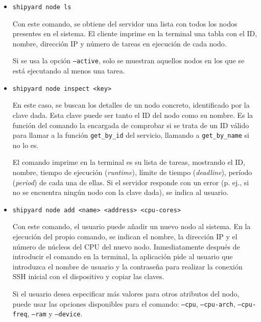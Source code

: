 \begin{itemize}
    \item \lstinline{shipyard node ls}

          Con este comando, se obtiene del servidor una lista con todos los nodos
          presentes en el sistema. El cliente imprime en la terminal una tabla con
          el ID, nombre, dirección IP y número de tareas en ejecución de cada
          nodo.

          Si se usa la opción \texttt{--active}, solo se muestran aquellos nodos
          en los que se está ejecutando al menos una tarea.

    \item \lstinline{shipyard node inspect <key>}

          En este caso, se buscan los detalles de un nodo concreto, identificado
          por la clave dada. Esta clave puede ser tanto el ID del nodo como su
          nombre. Es la función del comando la encargada de comprobar si se trata
          de un ID válido  para llamar a la función \lstinline{get_by_id} del
          servicio, llamando a \lstinline{get_by_name} si no lo es.

          El comando imprime en la terminal es su lista de tareas, mostrando el
          ID, nombre, tiempo de ejecución (\textit{runtime}), límite de tiempo
          (\textit{deadline}), período (\textit{period}) de cada una de ellas. Si
          el servidor responde con un error (p. ej., si no se encuentra ningún
          nodo con la clave dada), se indica al usuario.

    \item \lstinline{shipyard node add <name> <address> <cpu-cores>}

          Con este comando, el usuario puede añadir un nuevo nodo al sistema. En
          la ejecución del propio comando, se indican el nombre, la dirección IP y
          el número de núcleos del CPU del nuevo nodo. Inmediatamente después de
          introducir el comando en la terminal, la aplicación pide al usuario que
          introduzca el nombre de usuario y la contraseña para realizar la
          conexión SSH inicial con el dispositivo y copiar las claves.

          Si el usuario desea especificar más valores para otros atributos del
          nodo, puede usar las opciones disponibles para el comando:
          \texttt{--cpu}, \texttt{--cpu-arch}, \texttt{--cpu-freq}, \texttt{--ram}
          y \texttt{--device}.


\end{itemize}
